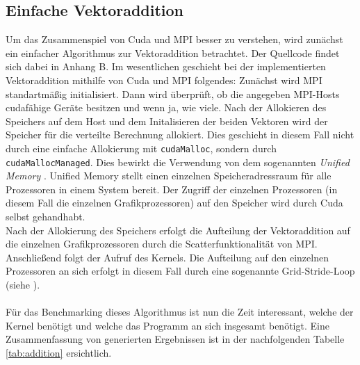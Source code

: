 \documentclass[doktyp=semarbeit, sprache=german]{TUBAFarbeiten}
\begin{document}
\subsection{Einfache Vektoraddition}
Um das Zusammenspiel von Cuda und MPI besser zu verstehen, wird zunächst ein einfacher Algorithmus zur Vektoraddition betrachtet. Der Quellcode findet sich dabei in Anhang B. Im wesentlichen geschieht bei der implementierten Vektoraddition mithilfe von Cuda und MPI folgendes: Zunächst wird MPI standartmäßig initialisiert. Dann wird überprüft, ob die angegeben MPI-Hosts cudafähige Geräte besitzen und wenn ja, wie viele. Nach der Allokieren des Speichers auf dem Host und dem Initalisieren der beiden Vektoren wird der Speicher für die verteilte Berechnung allokiert. Dies geschieht in diesem Fall nicht durch eine einfache Allokierung mit \texttt{cudaMalloc}, sondern durch \texttt{cudaMallocManaged}. Dies bewirkt die Verwendung von dem sogenannten \textit{Unified Memory} \cite{UnifiedMemory}. Unified Memory stellt einen einzelnen Speicheradressraum für alle Prozessoren in einem System bereit. Der Zugriff der einzelnen Prozessoren (in diesem Fall die einzelnen Grafikprozessoren) auf den Speicher wird durch Cuda selbst gehandhabt.
\\Nach der Allokierung des Speichers erfolgt die Aufteilung der Vektoraddition auf die einzelnen Grafikprozessoren durch die Scatterfunktionalität von MPI. Anschließend folgt der Aufruf des Kernels. Die Aufteilung auf den einzelnen Prozessoren an sich erfolgt in diesem Fall durch eine sogenannte Grid-Stride-Loop (siehe \cite{GridStride}).
\\\\Für das Benchmarking dieses Algorithmus ist nun die Zeit interessant, welche der Kernel benötigt und welche das Programm an sich insgesamt benötigt. Eine Zusammenfassung von generierten Ergebnissen ist in der nachfolgenden Tabelle \ref{tab:addition} ersichtlich.
\end{document}
